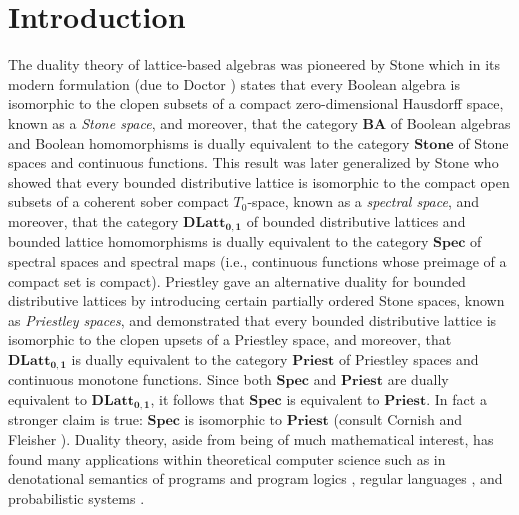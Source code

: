 \documentclass{amsart}
\theoremstyle{plain}
\theoremstyle{definition}
\begin{document}
\section{Introduction}
The duality theory of lattice-based algebras was pioneered by Stone \cite{stone1} which in its modern formulation (due to Doctor \cite{doctor}) states that every Boolean algebra is isomorphic to the clopen subsets of a compact zero-dimensional Hausdorff space, known as a \emph{Stone space}, and moreover, that the category $\mathbf{BA}$ of Boolean algebras and Boolean homomorphisms is dually equivalent to the category $\mathbf{Stone}$ of Stone spaces and continuous functions. This result was later generalized by Stone \cite{stone2} who showed that every bounded distributive lattice is isomorphic to the compact open subsets of a coherent sober compact $T_0$-space, known as a \emph{spectral space}, and moreover, that the category $\mathbf{DLatt_{0,1}}$ of bounded distributive lattices and bounded lattice homomorphisms is dually equivalent to the category $\mathbf{Spec}$ of spectral spaces and spectral maps (i.e., continuous functions whose preimage of a compact set is compact). Priestley \cite{priestly} gave an alternative duality for bounded distributive lattices by introducing certain partially ordered Stone spaces, known as \emph{Priestley spaces}, and demonstrated that every bounded distributive lattice is isomorphic to the clopen upsets of a Priestley space, and moreover, that $\mathbf{DLatt_{0,1}}$ is dually equivalent to the category $\mathbf{Priest}$ of Priestley spaces and continuous monotone functions. Since both $\textbf{Spec}$ and $\textbf{Priest}$ are dually equivalent to $\mathbf{DLatt_{0,1}}$, it follows that $\textbf{Spec}$ is equivalent to $\textbf{Priest}$. In fact a stronger claim is true: $\textbf{Spec}$ is isomorphic to $\textbf{Priest}$ (consult Cornish \cite{cornish} and Fleisher \cite{fleisher}). Duality theory, aside from being of much mathematical interest, has found many applications within theoretical computer science such as in denotational semantics of programs and program logics \cite{abram}, regular languages \cite{gehrke}, and probabilistic systems \cite{alv, jung1, jung2, jung3}.       


 

 
\end{document}
